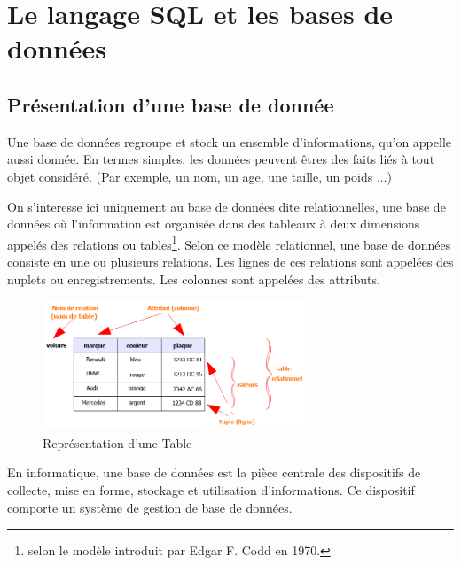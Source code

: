 \documentclass[oneside,13pt,a4paper]{report}
\begin{document}

\chapter{Le langage SQL et les bases de données}


\section{Présentation d’une base de donnée}

Une base de données regroupe et stock un ensemble d’informations, qu'on appelle aussi donnée.
En termes simples, les données peuvent êtres des faits liés à tout objet considéré.
(Par exemple, un nom, un age, une taille, un poids ...)

On s'interesse ici uniquement au base de données dite relationnelles, une base de données où l'information est organisée dans des tableaux à deux dimensions appelés des relations ou tables\footnote{ selon le modèle introduit par Edgar F. Codd en 1970.}.
Selon ce modèle relationnel, une base de données consiste en une ou plusieurs relations. Les lignes de ces relations sont appelées des nuplets ou enregistrements. Les colonnes sont appelées des attributs.

\begin{figure}[h]
	\centering
	\includegraphics[width=0.7\textwidth]{img/table_relationnel.png}
	\caption{Représentation d'une Table}
\end{figure}

En informatique, une base de données est la pièce centrale des dispositifs de collecte, mise en forme, stockage et utilisation d'informations.
Ce dispositif comporte un système de gestion de base de données.
\end{document}
